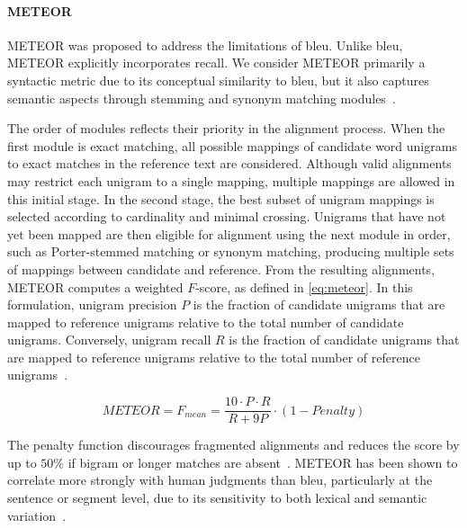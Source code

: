 
\paragraph{METEOR}
METEOR was proposed to address the limitations of \ac{bleu}. 
Unlike \ac{bleu}, METEOR explicitly incorporates recall. 
We consider METEOR primarily a syntactic metric due to its conceptual similarity to \ac{bleu}, but it also captures semantic aspects through stemming and synonym matching modules~\citep{kurt_pehlivanoglu_comparative_2024}. 

The order of modules reflects their priority in the alignment process. 
When the first module is exact matching, all possible mappings of candidate word unigrams to exact matches in the reference text are considered. 
Although valid alignments may restrict each unigram to a single mapping, multiple mappings are allowed in this initial stage. 
In the second stage, the best subset of unigram mappings is selected according to cardinality and minimal crossing. 
Unigrams that have not yet been mapped are then eligible for alignment using the next module in order, such as Porter-stemmed matching or synonym matching, producing multiple sets of mappings between candidate and reference. 
From the resulting alignments, METEOR computes a weighted $F$-score, as defined in \autoref{eq:meteor}. 
In this formulation, unigram precision $P$ is the fraction of candidate unigrams that are mapped to reference unigrams relative to the total number of candidate unigrams. 
Conversely, unigram recall $R$ is the fraction of candidate unigrams that are mapped to reference unigrams relative to the total number of reference unigrams~\citep{banerjee_METEOR_2005}.

\begin{equation}
    METEOR = F_{mean} = \frac{10 \cdot P \cdot R}{R + 9P} \cdot (1 - Penalty)
\label{eq:meteor}
\end{equation}

The penalty function discourages fragmented alignments and reduces the score by up to $50\%$ if bigram or longer matches are absent~\citep{banerjee_METEOR_2005}. 
METEOR has been shown to correlate more strongly with human judgments than \ac{bleu}, particularly at the sentence or segment level, due to its sensitivity to both lexical and semantic variation~\citep{zhou_paraphrase_2021,kurt_pehlivanoglu_comparative_2024}.




